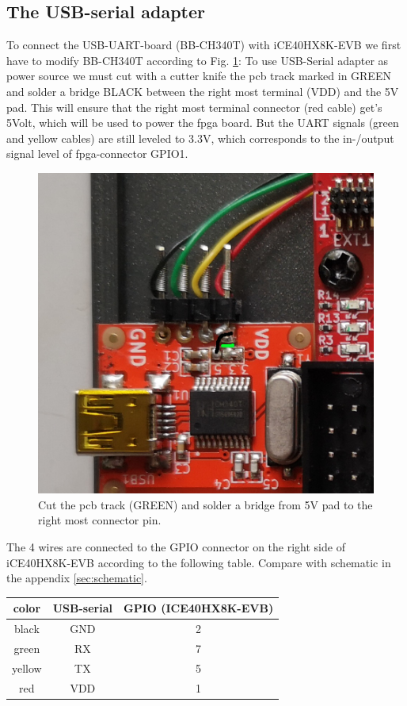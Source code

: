\documentclass[a4paper,ngerman]{scrartcl}
\begin{document}
\subsection{The USB-serial adapter}
To connect the USB-UART-board (BB-CH340T) with iCE40HX8K-EVB we first have to modify BB-CH340T according to Fig. \ref{fig:detail}: To use USB-Serial adapter as power source we must cut with a cutter knife the pcb track marked in GREEN and solder a bridge BLACK between the right most terminal (VDD) and the 5V pad.
This will ensure that the right most terminal connector (red cable) get's 5Volt, which will be used to power the fpga board. But the UART signals (green and yellow cables) are still leveled to 3.3V, which corresponds to the in-/output signal level of fpga-connector GPIO1.
\begin{figure}[H]
	\centering
	\includegraphics[width=0.6\linewidth]{../detail.png}
	\caption{Cut the pcb track (GREEN) and solder a bridge from 5V pad to the right most connector pin.}
	\label{fig:detail}
\end{figure}

The 4 wires are connected to the GPIO connector on the right side of iCE40HX8K-EVB according to the following table. Compare with schematic in the appendix  \ref{sec:schematic}.

\begin{table}[H]
	\centering
	
	\begin{tabular}{|c|c|c|}
		\hline 
		color & USB-serial & GPIO (ICE40HX8K-EVB) \\ 
		\hline 
		black & GND & 2 \\ 
		\hline 
		green & RX & 7 \\ 
		\hline 
		yellow & TX & 5 \\ 
		\hline 
		red & VDD & 1 \\ 
		\hline 
	\end{tabular} 
\end{table}
\end{document}
